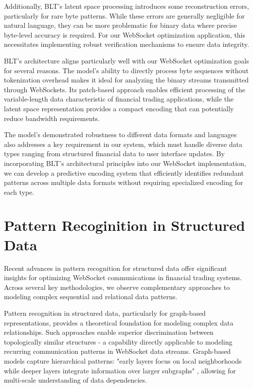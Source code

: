 \documentclass[a4paper, 11pt, twoside, openright]{report}
\begin{document}
Additionally, BLT's latent space processing introduces some reconstruction errors, particularly for rare byte patterns. While these errors are generally negligible for natural language, they can be more problematic for binary data where precise byte-level accuracy is required. For our WebSocket optimization application, this necessitates implementing robust verification mechanisms to ensure data integrity.


BLT's architecture aligns particularly well with our WebSocket optimization goals for several reasons. The model's ability to directly process byte sequences without tokenization overhead makes it ideal for analyzing the binary streams transmitted through WebSockets. Its patch-based approach enables efficient processing of the variable-length data characteristic of financial trading applications, while the latent space representation provides a compact encoding that can potentially reduce bandwidth requirements.

The model's demonstrated robustness to different data formats and languages also addresses a key requirement in our system, which must handle diverse data types ranging from structured financial data to user interface updates. By incorporating BLT's architectural principles into our WebSocket implementation, we can develop a predictive encoding system that efficiently identifies redundant patterns across multiple data formats without requiring specialized encoding for each type.

\section{Pattern Recoginition in Structured Data}
Recent advances in pattern recognition for structured data offer significant insights for optimizing WebSocket communications in financial trading systems. Across several key methodologies, we observe complementary approaches to modeling complex sequential and relational data patterns.

Pattern recognition in structured data, particularly for graph-based representations, provides a theoretical foundation for modeling complex data relationships. Such approaches enable superior discrimination between topologically similar structures - a capability directly applicable to modeling recurring communication patterns in WebSocket data streams. Graph-based models capture hierarchical patterns: "early layers focus on local neighborhoods while deeper layers integrate information over larger subgraphs" \cite{CODE4STRUCT2023}, allowing for multi-scale understanding of data dependencies.
\end{document}

